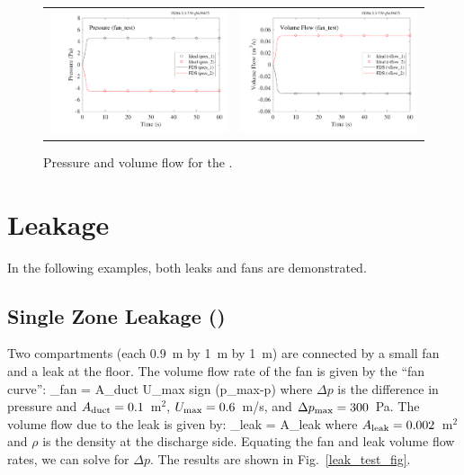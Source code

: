 \documentclass[11pt]{book}
\begin{document}
\begin{figure}[ht]
\begin{tabular*}{\textwidth}{lr}
\includegraphics[width=3.1in]{SCRIPT_FIGURES/fan_test_Pressure} &
\includegraphics[width=3.1in]{SCRIPT_FIGURES/fan_test_Volume_Flow}
\end{tabular*}
\caption[Results of the  case]{Pressure and volume flow for the .}
\label{fan_test_fig}
\end{figure}

\clearpage

\section{Leakage}

In the following examples, both leaks and fans are demonstrated.

\subsection{Single Zone Leakage (\texorpdfstring{}{leak\_test})}
\label{single_zone_leak}
\label{leak_test}

Two compartments (each 0.9~m by 1~m by 1~m) are connected by a small fan and a leak at the floor. The volume flow rate of the fan is given by the ``fan curve'':
\be
  _{\hbox{\footnotesize fan}} = A_{\hbox{\footnotesize duct}}
  U_{\hbox{\footnotesize max}} \;
   \hbox{sign} (\Delta p_{\hbox{\footnotesize max}}-\Delta p)
\ee
where $\Delta p$ is the difference in pressure and $A_{\hbox{\scriptsize duct}}=0.1$~m$^2$, $U_{\hbox{\scriptsize max}}=0.6$~m/s, and $\Delta p_{\hbox{\scriptsize max}}=300$~Pa. The volume flow due to the leak is given by:
\be
   _{\hbox{\scriptsize leak}} = A_{\hbox{\scriptsize leak}} 
\ee
where $A_{\hbox{\scriptsize leak}}=0.002$~m$^2$ and $\rho$ is the density at the discharge side. Equating the fan and leak volume flow rates, we can solve for $\Delta p$. The results are shown in Fig.~\ref{leak_test_fig}.
\end{document}
